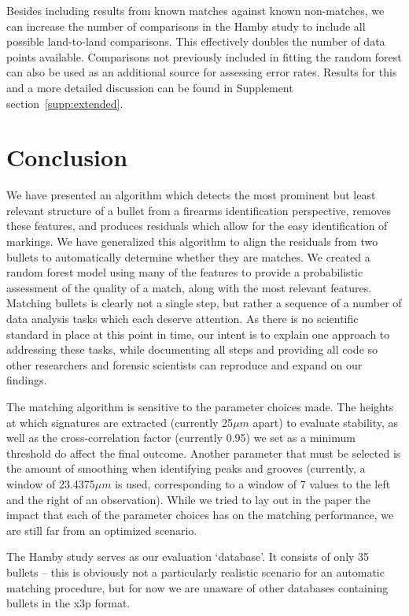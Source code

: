 \documentclass[aoas, preprint]{imsart}\usepackage[]{graphicx}\usepackage[]{color}
\begin{document}
Besides including results from known matches against known non-matches, we can increase the number of comparisons in the Hamby study to include all possible land-to-land comparisons. This effectively doubles the number of data points available. Comparisons not previously included in fitting the random forest can also be used as an additional source for assessing error rates.  Results for this and a more detailed discussion can be found in Supplement section~\ref{supp:extended}.

\section{Conclusion}

We have presented an algorithm which detects the most prominent but least relevant structure of a bullet from a firearms identification perspective, removes these features, and produces residuals which allow for the easy identification of markings. We have generalized this algorithm to align the residuals from two bullets to automatically determine whether they are matches. We created a random forest model using many of the features to provide a probabilistic assessment of the quality of a match, along with the most relevant features. Matching bullets is clearly not a single step, but rather a sequence of a number of data analysis tasks which each deserve attention. As there is no scientific standard in place at this point in time, our intent is to explain one approach to addressing these tasks, while documenting all steps and providing all code so other researchers and forensic scientists can reproduce and expand on our findings.

The matching algorithm is sensitive to the parameter choices made. The heights at which signatures are extracted (currently 25$\mu m$ apart) to evaluate stability, as well as the cross-correlation factor (currently 0.95) we set as a minimum threshold do affect the final outcome. Another parameter that must be selected is the amount of smoothing when identifying peaks and grooves (currently, a window of 23.4375$\mu m$ is used, corresponding to a window of 7 values to the left and the right of an observation). While we tried to lay out in the paper the impact that each of the parameter choices has on the matching performance, we are still far from an optimized scenario. 

The Hamby study serves as our evaluation `database'. It consists of only  35 bullets -- this is obviously not a particularly realistic scenario for an automatic matching procedure, but for now we are unaware of other databases containing bullets in the x3p format.
 
\end{document}
